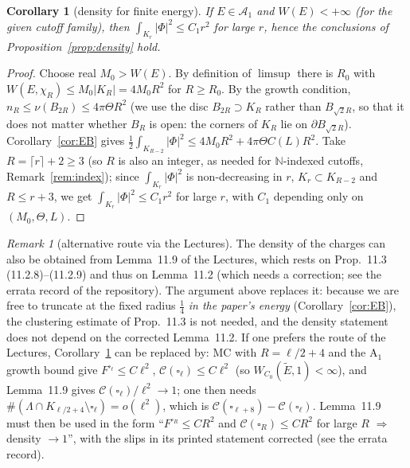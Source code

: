 \documentclass[11pt]{article}
\newtheorem{corollary}[theorem]{Corollary}
\theoremstyle{definition}
\theoremstyle{remark}
\newtheorem{remark}[theorem]{Remark}
\newcommand{\Lam}{\Lambda}
\newcommand{\tE}{\widetilde E}
\begin{document}
\begin{corollary}[density for finite energy]\label{cor:finite-density}
If $E\in\mathcal A_1$ and $W(E)<+\infty$ (for the given cutoff family), then $\int_{K_r}|\Phi|^2\le C_1r^2$ for large $r$, hence the conclusions of Proposition~\ref{prop:density} hold.
\end{corollary}
\begin{proof}
Choose real $M_0>W(E)$.  By definition of $\limsup$ there is $R_0$ with $W(E,\chi_R)\le M_0|K_R|=4M_0R^2$ for $R\ge R_0$.  By the growth condition, $n_R\le\nu(B_{2R})\le4\pi\Theta R^2$ (we use the disc $B_{2R}\supset K_R$ rather than $B_{\sqrt2R}$, so that it does not matter whether $B_R$ is open: the corners of $K_R$ lie on $\partial B_{\sqrt2R}$).  Corollary~\ref{cor:EB} gives $\frac12\int_{K_{R-2}}|\Phi|^2\le4M_0R^2+4\pi\Theta C(L)R^2$.  Take $R=\lceil r\rceil+2\ge3$ (so $R$ is also an integer, as needed for $\mathbb N$-indexed cutoffs, Remark~\ref{rem:index}); since $\int_{K_r}|\Phi|^2$ is non-decreasing in $r$, $K_r\subset K_{R-2}$ and $R\le r+3$, we get $\int_{K_r}|\Phi|^2\le C_1r^2$ for large $r$, with $C_1$ depending only on $(M_0,\Theta,L)$.
\end{proof}

\begin{remark}[alternative route via the Lectures]\label{rem:alt-density}
The density of the charges can also be obtained from Lemma~11.9 of the Lectures, which rests on Prop.~11.3 (11.2.8)--(11.2.9) and thus on Lemma~11.2 (which needs a correction; see the errata record of the repository).  The argument above replaces it: because we are free to truncate at the fixed radius $\frac14$ \emph{in the paper's energy} (Corollary~\ref{cor:EB}), the clustering estimate of Prop.~11.3 is not needed, and the density statement does not depend on the corrected Lemma~11.2.  If one prefers the route of the Lectures, Corollary~\ref{cor:finite-density} can be replaced by: MC with $R=\ell/2+4$ and the A$_1$ growth bound give $F^{\square_\ell}\le C\ell^2$, $\mathcal C(\square_\ell)\le C\ell^2$ (so $W_{C_0}(\tE,1)<\infty$), and Lemma~11.9 gives $\mathcal C(\square_\ell)/\ell^2\to1$; one then needs $\#(\Lam\cap K_{\ell/2+4}\setminus\square_\ell)=o(\ell^2)$, which is $\mathcal C(\square_{\ell+8})-\mathcal C(\square_\ell)$.  Lemma~11.9 must then be used in the form ``$F^{\square_R}\le CR^2$ and $\mathcal C(\square_R)\le CR^2$ for large $R$ $\Rightarrow$ density $\to1$'', with the slips in its printed statement corrected (see the errata record).
\end{remark}
\end{document}
